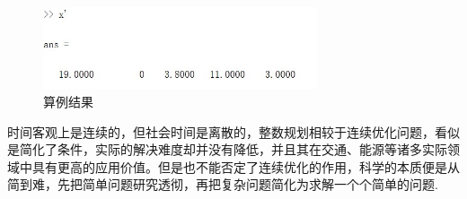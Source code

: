 \documentclass{beamer}
\begin{document}
\begin{CJK}{UTF8}{song}
\begin{frame}[allowframebreaks]
\begin{figure}
\centering
\includegraphics[width=0.72\textwidth]{ans1.jpg}
\caption{算例结果}
\end{figure}
时间客观上是连续的，但社会时间是离散的，整数规划相较于连续优化问题，看似是简化了条件，实际的解决难度却并没有降低，并且其在交通、能源等诸多实际领域中具有更高的应用价值。但是也不能否定了连续优化的作用，科学的本质便是从简到难，先把简单问题研究透彻，再把复杂问题简化为求解一个个简单的问题.
\end{frame}

\end{CJK}
\end{document}
